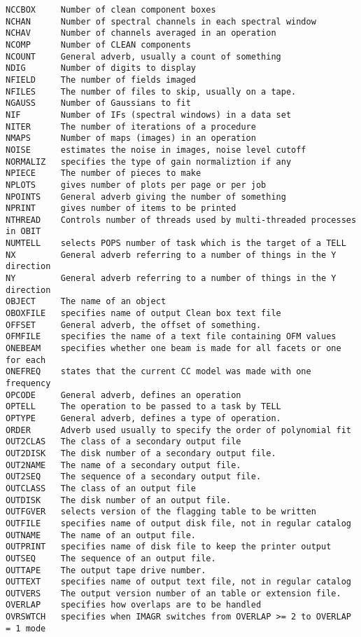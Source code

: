 \begin{verbatim}
NCCBOX     Number of clean component boxes
NCHAN      Number of spectral channels in each spectral window
NCHAV      Number of channels averaged in an operation
NCOMP      Number of CLEAN components
NCOUNT     General adverb, usually a count of something
NDIG       Number of digits to display
NFIELD     The number of fields imaged
NFILES     The number of files to skip, usually on a tape.
NGAUSS     Number of Gaussians to fit
NIF        Number of IFs (spectral windows) in a data set
NITER      The number of iterations of a procedure
NMAPS      Number of maps (images) in an operation
NOISE      estimates the noise in images, noise level cutoff
NORMALIZ   specifies the type of gain normaliztion if any
NPIECE     The number of pieces to make
NPLOTS     gives number of plots per page or per job
NPOINTS    General adverb giving the number of something
NPRINT     gives number of items to be printed
NTHREAD    Controls number of threads used by multi-threaded processes in OBIT
NUMTELL    selects POPS number of task which is the target of a TELL
NX         General adverb referring to a number of things in the Y direction
NY         General adverb referring to a number of things in the Y direction
OBJECT     The name of an object
OBOXFILE   specifies name of output Clean box text file
OFFSET     General adverb, the offset of something.
OFMFILE    specifies the name of a text file containing OFM values
ONEBEAM    specifies whether one beam is made for all facets or one for each
ONEFREQ    states that the current CC model was made with one frequency
OPCODE     General adverb, defines an operation
OPTELL     The operation to be passed to a task by TELL
OPTYPE     General adverb, defines a type of operation.
ORDER      Adverb used usually to specify the order of polynomial fit
OUT2CLAS   The class of a secondary output file
OUT2DISK   The disk number of a secondary output file.
OUT2NAME   The name of a secondary output file.
OUT2SEQ    The sequence of a secondary output file.
OUTCLASS   The class of an output file
OUTDISK    The disk number of an output file.
OUTFGVER   selects version of the flagging table to be written
OUTFILE    specifies name of output disk file, not in regular catalog
OUTNAME    The name of an output file.
OUTPRINT   specifies name of disk file to keep the printer output
OUTSEQ     The sequence of an output file.
OUTTAPE    The output tape drive number.
OUTTEXT    specifies name of output text file, not in regular catalog
OUTVERS    The output version number of an table or extension file.
OVERLAP    specifies how overlaps are to be handled
OVRSWTCH   specifies when IMAGR switches from OVERLAP >= 2 to OVERLAP = 1 mode

\end{verbatim}
